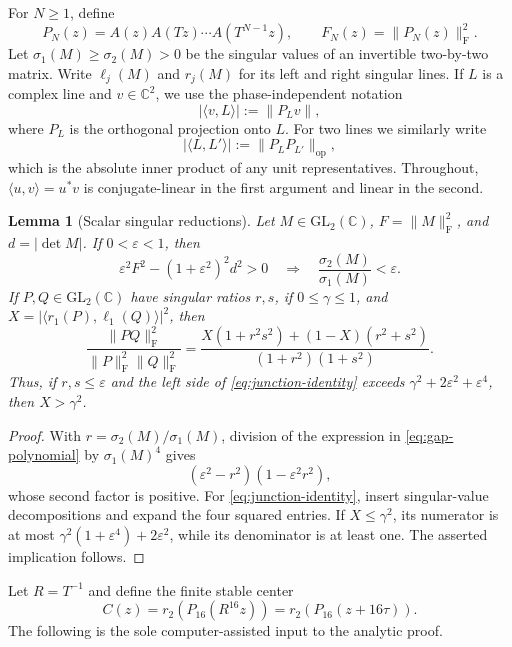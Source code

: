 \documentclass[10pt,a4paper]{amsart}
\numberwithin{equation}{section}
\newtheorem{lemma}[theorem]{Lemma}
\newcommand{\C}{\mathbb C}
\newcommand{\ip}[2]{\langle #1,#2\rangle}
\newcommand{\norm}[1]{\lVert #1\rVert}
\newcommand{\abs}[1]{\lvert #1\rvert}
\newcommand{\Frob}{\mathrm F}
\begin{document}
For $N\ge1$, define
\begin{equation}\label{eq:PN}
 P_N(z)=A(z)A(Tz)\cdots A(T^{N-1}z),\qquad
 F_N(z)=\norm{P_N(z)}_{\Frob}^2.
\end{equation}
Let $\sigma_1(M)\ge\sigma_2(M)>0$ be the singular values of an invertible
two-by-two matrix.  Write $\ell_j(M)$ and $r_j(M)$ for its left and right
singular lines.  If $L$ is a complex line and $v\in\C^2$, we use the
phase-independent notation
\[
 \abs{\ip{v}{L}}:=\norm{P_L v},
\]
where $P_L$ is the orthogonal projection onto $L$.  For two lines we similarly
write
\[
 \abs{\ip{L}{L'}}:=\norm{P_L P_{L'}}_{\mathrm{op}},
\]
which is the absolute inner product of any unit representatives.
Throughout, $\ip{u}{v}=u^*v$ is conjugate-linear in the first argument and
linear in the second.

\begin{lemma}[Scalar singular reductions]\label{lem:scalar-reductions}
Let $M\in\mathrm{GL}_2(\C)$, $F=\norm M_{\Frob}^2$, and
$d=\abs{\det M}$.  If $0<\varepsilon<1$, then
\begin{equation}\label{eq:gap-polynomial}
 \varepsilon^2F^2-(1+\varepsilon^2)^2d^2>0
 \quad\Longrightarrow\quad
 \frac{\sigma_2(M)}{\sigma_1(M)}<\varepsilon.
\end{equation}
If $P,Q\in\mathrm{GL}_2(\C)$ have singular ratios $r,s$, if
$0\le\gamma\le1$, and
$X=\abs{\ip{r_1(P)}{\ell_1(Q)}}^2$, then
\begin{equation}\label{eq:junction-identity}
 \frac{\norm{PQ}_{\Frob}^2}
 {\norm P_{\Frob}^2\norm Q_{\Frob}^2}
 =\frac{X(1+r^2s^2)+(1-X)(r^2+s^2)}
 {(1+r^2)(1+s^2)}.
\end{equation}
Thus, if $r,s\le\varepsilon$ and the left side of
\eqref{eq:junction-identity} exceeds
$\gamma^2+2\varepsilon^2+\varepsilon^4$, then $X>\gamma^2$.
\end{lemma}

\begin{proof}
With $r=\sigma_2(M)/\sigma_1(M)$, division of the expression in
\eqref{eq:gap-polynomial} by $\sigma_1(M)^4$ gives
\[
 (\varepsilon^2-r^2)(1-\varepsilon^2r^2),
\]
whose second factor is positive.  For \eqref{eq:junction-identity}, insert
singular-value decompositions and expand the four squared entries.  If
$X\le\gamma^2$, its numerator is at most
$\gamma^2(1+\varepsilon^4)+2\varepsilon^2$, while its denominator is at
least one.  The asserted implication follows.
\end{proof}

Let $R=T^{-1}$ and define the finite stable center
\begin{equation}\label{eq:finite-center-first}
 C(z)=r_2(P_{16}(R^{16}z))=r_2(P_{16}(z+16\tau)).
\end{equation}
The following is the sole computer-assisted input to the analytic proof.
\end{document}
